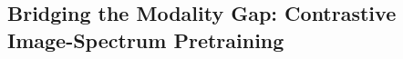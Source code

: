 \documentclass[dvipsnames,table]{article}
\newcommand\pile{\textsc{Multimodal Universe}\xspace}
\begin{document}











\subsection{Bridging the Modality Gap: Contrastive Image-Spectrum Pretraining}
\end{document}
